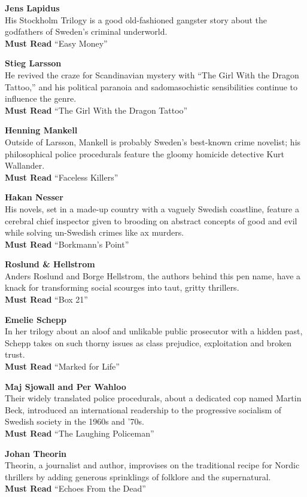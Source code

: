 \textbf{Jens Lapidus}\\
His Stockholm Trilogy is a good old-fashioned gangster story about the
godfathers of Sweden's criminal underworld.\\
\textbf{Must Read} ``Easy Money''

\textbf{Stieg Larsson}\\
He revived the craze for Scandinavian mystery with ``The Girl With the
Dragon Tattoo,'' and his political paranoia and sadomasochistic
sensibilities continue to influence the genre.\\
\textbf{Must Read} ``The Girl With the Dragon Tattoo''

\textbf{Henning Mankell}\\
Outside of Larsson, Mankell is probably Sweden's best-known crime
novelist; his philosophical police procedurals feature the gloomy
homicide detective Kurt Wallander.\\
\textbf{Must Read} ``Faceless Killers''

\textbf{Hakan Nesser}\\
His novels, set in a made-up country with a vaguely Swedish coastline,
feature a cerebral chief inspector given to brooding on abstract
concepts of good and evil while solving un-Swedish crimes like ax
murders.\\
\textbf{Must Read} ``Borkmann's Point''

\textbf{Roslund \& Hellstrom}\\
Anders Roslund and Borge Hellstrom, the authors behind this pen name,
have a knack for transforming social scourges into taut, gritty
thrillers.\\
\textbf{Must Read} ``Box 21''

\textbf{Emelie Schepp}\\
In her trilogy about an aloof and unlikable public prosecutor with a
hidden past, Schepp takes on such thorny issues as class prejudice,
exploitation and broken trust.\\
\textbf{Must Read} ``Marked for Life''

\textbf{Maj Sjowall and Per Wahloo}\\
Their widely translated police procedurals, about a dedicated cop named
Martin Beck, introduced an international readership to the progressive
socialism of Swedish society in the 1960s and '70s.\\
\textbf{Must Read} ``The Laughing Policeman''

\textbf{Johan Theorin}\\
Theorin, a journalist and author, improvises on the traditional recipe
for Nordic thrillers by adding generous sprinklings of folklore and the
supernatural.\\
\textbf{Must Read} ``Echoes From the Dead''

